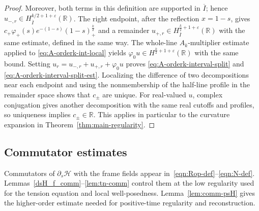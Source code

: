 \documentclass[11pt,reqno]{amsart}
\theoremstyle{plain}
\theoremstyle{definition}
\numberwithin{equation}{section}
\newcommand{\p}{\partial}
\newcommand{\mc}[1]{\mathcal{#1}}
\newcommand{\vph}{\varphi}
\newcommand{\R}{\mathbb{R}}
\begin{document}
\begin{proof}
Moreover, both terms in this definition are supported in
$\overline I$; hence
$u_{-,r}\in H^{k/2+1+\varepsilon}_{\overline I}(\R)$.
The right endpoint, after the
reflection $x=1-s$, gives
$c_+\vph_+(s)e^{-(1-s)}(1-s)_+^{\frac{k}{2}}$ and a remainder
$u_{+,r}\in H^{\frac{k}{2}+1+\varepsilon}_{\overline I}(\R)$ with the same
estimate, defined in the same way.
The whole-line $A_k$-multiplier estimate applied to
\eqref{eq:A-orderk-int-local} yields
$\vph_0u\in H^{\frac{k}{2}+1+\varepsilon}(\R)$ with the same bound.
Setting
$u_r=u_{-,r}+u_{+,r}+\vph_0u$ proves
\eqref{eq:A-orderk-interval-split} and
\eqref{eq:A-orderk-interval-split-est}.
Localizing the difference of two decompositions near each endpoint and
using the nonmembership of the half-line profile in the remainder space
shows that $c_\pm$ are unique. For real-valued $u$, complex conjugation
gives another decomposition with the same real cutoffs and profiles, so
uniqueness implies $c_\pm\in\R$. This applies in particular to the
curvature expansion in Theorem~\ref{thm:main-regularity}.
\end{proof}

\subsection{Commutator estimates}
\label{subsec:commutator-estimates}

Commutators of $\p_s\mc H$ with the frame fields appear
in~\eqref{eqn:Rop-def}--\eqref{eqn:N-def}.
Lemmas~\ref{dsH_f_comm}--\ref{lem:tn-comm} control them at the low
regularity used for the tension equation and local well-posedness.
Lemma~\ref{lem:comm-psH} gives the higher-order estimate needed for
positive-time regularity and reconstruction.
\end{document}
